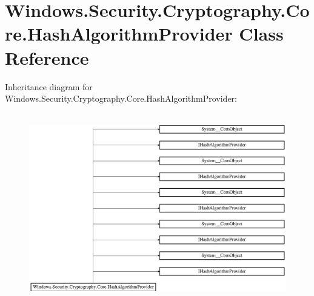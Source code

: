 \hypertarget{class_windows_1_1_security_1_1_cryptography_1_1_core_1_1_hash_algorithm_provider}{}\section{Windows.\+Security.\+Cryptography.\+Core.\+Hash\+Algorithm\+Provider Class Reference}
\label{class_windows_1_1_security_1_1_cryptography_1_1_core_1_1_hash_algorithm_provider}
Inheritance diagram for Windows.\+Security.\+Cryptography.\+Core.\+Hash\+Algorithm\+Provider\+:\begin{figure}[H]
\begin{center}
\leavevmode
\includegraphics[height=8.324325cm]{class_windows_1_1_security_1_1_cryptography_1_1_core_1_1_hash_algorithm_provider}
\end{center}
\end{figure}
